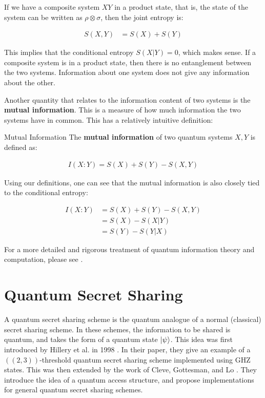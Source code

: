 \begin{example}
    If we have a composite system $XY$ in a product state, that is, the state of the system can be written as $\rho \otimes \sigma$, then the joint entropy is:
\end{example}

\begin{align}
    S(X,Y) &= S(X) + S(Y)
\end{align}

This implies that the conditional entropy $S(X|Y) = 0$, which makes sense. If a composite system is in a product state, then there is no entanglement between the two systems. Information about one system does not give any information about the other.

Another quantity that relates to the information content of two systems is the \textbf{mutual information}. This is a measure of how much information the two systems have in common. This has a relatively intuitive definition:

\begin{definition}{Mutual Information}
    The \textbf{mutual information} of two quantum systems $X,Y$ is defined as:
    
    \begin{align}
        I(X:Y) = S(X) + S(Y) - S(X,Y)
    \end{align}
\end{definition}

Using our definitions, one can see that the mutual information is also closely tied to the conditional entropy:

\begin{align}
        I(X:Y) &= S(X) + S(Y) - S(X,Y) \\ 
        &= S(X) - S(X|Y) \\ 
        &= S(Y) - S(Y|X)
\end{align}

For a more detailed and rigorous treatment of quantum information theory and computation, please see \cite{nielsen_quantum_2010}.

\section{Quantum Secret Sharing}
\label{section:qss}

A quantum secret sharing scheme is the quantum analogue of a normal (classical) secret sharing scheme. In these schemes, the information to be shared is quantum, and takes the form of a quantum state $\ket{\psi}$. This idea was first introduced by Hillery et al. in 1998 \cite{hillery_quantum_1999}. In their paper, they give an example of a $((2,3))$-threshold quantum secret sharing scheme implemented using GHZ states. This was then extended by the work of Cleve, Gottesman, and Lo \cite{cleve_how_1999}. They introduce the idea of a quantum access structure, and propose implementations for general quantum secret sharing schemes.

